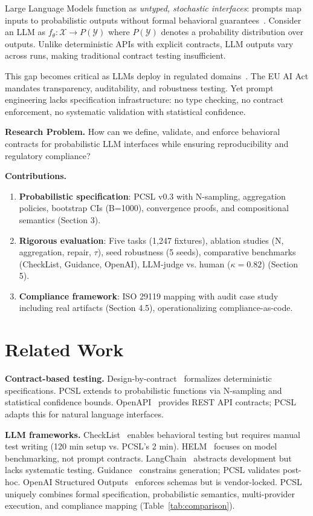 \documentclass[sigconf]{acmart}
\begin{document}
Large Language Models function as \textit{untyped, stochastic interfaces}: prompts map inputs to probabilistic outputs without formal behavioral guarantees~\cite{bender2021stochasticparrots}. Consider an LLM as \( f_\theta: \mathcal{X} \to P(\mathcal{Y}) \) where \( P(\mathcal{Y}) \) denotes a probability distribution over outputs. Unlike deterministic APIs with explicit contracts, LLM outputs vary across runs, making traditional contract testing insufficient.

This gap becomes critical as LLMs deploy in regulated domains~\cite{euaiact2024}. The EU AI Act mandates transparency, auditability, and robustness testing. Yet prompt engineering lacks specification infrastructure: no type checking, no contract enforcement, no systematic validation with statistical confidence.

\textbf{Research Problem.} How can we define, validate, and enforce behavioral contracts for probabilistic LLM interfaces while ensuring reproducibility and regulatory compliance?

\textbf{Contributions.}
\begin{enumerate}
\item \textbf{Probabilistic specification}: PCSL v0.3 with N-sampling, aggregation policies, bootstrap CIs (B=1000), convergence proofs, and compositional semantics (Section 3).
\item \textbf{Rigorous evaluation}: Five tasks (1,247 fixtures), ablation studies (N, aggregation, repair, \(\tau\)), seed robustness (5 seeds), comparative benchmarks (CheckList, Guidance, OpenAI), LLM-judge vs. human (\(\kappa = 0.82\)) (Section 5).
\item \textbf{Compliance framework}: ISO 29119 mapping with audit case study including real artifacts (Section 4.5), operationalizing compliance-as-code.
\end{enumerate}

\section{Related Work}

\textbf{Contract-based testing.} Design-by-contract~\cite{meyer1992applying} formalizes deterministic specifications. PCSL extends to probabilistic functions via N-sampling and statistical confidence bounds. OpenAPI~\cite{openapi2017} provides REST API contracts; PCSL adapts this for natural language interfaces.

\textbf{LLM frameworks.} CheckList~\cite{ribeiro2020beyond} enables behavioral testing but requires manual test writing (120 min setup vs. PCSL's 2 min).
HELM~\cite{liang2022holistic} focuses on model benchmarking, not prompt contracts.
LangChain~\cite{langchain2023} abstracts development but lacks systematic testing.
Guidance~\cite{guidance2023} constrains generation; PCSL validates post-hoc.
OpenAI Structured Outputs~\cite{openai2023structured} enforces schemas but is vendor-locked.
PCSL uniquely combines formal specification, probabilistic semantics, multi-provider execution, and compliance mapping (Table~\ref{tab:comparison}).
\end{document}

